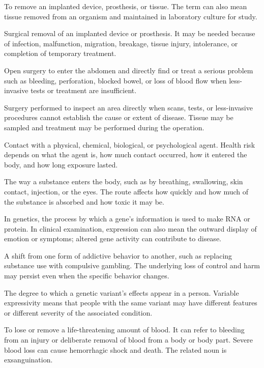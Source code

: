  To remove an implanted device, prosthesis, or tissue. The term can also mean tissue removed from an organism and maintained in laboratory culture for study.

 Surgical removal of an implanted device or prosthesis. It may be needed because of infection, malfunction, migration, breakage, tissue injury, intolerance, or completion of temporary treatment.

 Open surgery to enter the abdomen and directly find or treat a serious problem such as bleeding, perforation, blocked bowel, or loss of blood flow when less-invasive tests or treatment are insufficient.

 Surgery performed to inspect an area directly when scans, tests, or less-invasive procedures cannot establish the cause or extent of disease. Tissue may be sampled and treatment may be performed during the operation.

 Contact with a physical, chemical, biological, or psychological agent. Health risk depends on what the agent is, how much contact occurred, how it entered the body, and how long exposure lasted.

 The way a substance enters the body, such as by breathing, swallowing, skin contact, injection, or the eyes. The route affects how quickly and how much of the substance is absorbed and how toxic it may be.

 In genetics, the process by which a gene’s information is used to make RNA or protein. In clinical examination, expression can also mean the outward display of emotion or symptoms; altered gene activity can contribute to disease.

 A shift from one form of addictive behavior to another, such as replacing substance use with compulsive gambling. The underlying loss of control and harm may persist even when the specific behavior changes.

 The degree to which a genetic variant’s effects appear in a person. Variable expressivity means that people with the same variant may have different features or different severity of the associated condition.

 To lose or remove a life-threatening amount of blood. It can refer to bleeding from an injury or deliberate removal of blood from a body or body part. Severe blood loss can cause hemorrhagic shock and death. The related noun is exsanguination.


